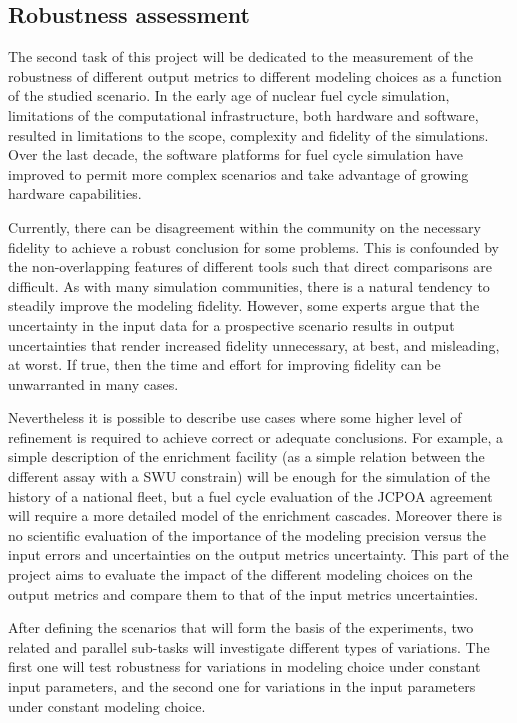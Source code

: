 
\subsection{Robustness assessment}

The second task of this project will be dedicated to the measurement of the
robustness of different output metrics to different modeling choices as a
function of the studied scenario.  In the early age of nuclear fuel cycle
simulation, limitations of the computational infrastructure, both hardware and
software, resulted in limitations to the scope, complexity and fidelity of the
simulations.  Over the last decade, the software platforms for fuel cycle
simulation have improved to permit more complex scenarios and take advantage
of growing hardware capabilities.

Currently, there can be disagreement within the community on the necessary
fidelity to achieve a robust conclusion for some problems.  This is confounded
by the non-overlapping features of different tools such that direct
comparisons are difficult. As with many simulation communities, there is a
natural tendency to steadily improve the modeling fidelity.  However, some
experts argue that the uncertainty in the input data for a prospective
scenario results in output uncertainties that render increased fidelity
unnecessary, at best, and misleading, at worst.  If true, then the time and
effort for improving fidelity can be unwarranted in many cases.

Nevertheless it is possible to describe use cases where some higher level of
refinement is required to achieve correct or adequate conclusions. For
example, a simple description of the enrichment facility (as a simple relation
between the different assay with a SWU constrain) will be enough for the
simulation of the history of a national fleet, but a fuel cycle evaluation of
the JCPOA agreement\cite{jcpoa} will require a more detailed model of the enrichment
cascades. Moreover there is no scientific evaluation of the importance of the
modeling precision versus the input errors and uncertainties on the output
metrics uncertainty. This part of the project aims to evaluate the impact of
the different modeling choices on the output metrics and compare them to that
of the input metrics uncertainties.

After defining the scenarios that will form the basis of the experiments, two
related and parallel sub-tasks will investigate different types of variations.
The first one will test robustness for variations in modeling choice under
constant input parameters, and the second one for variations in the input
parameters under constant modeling choice.

